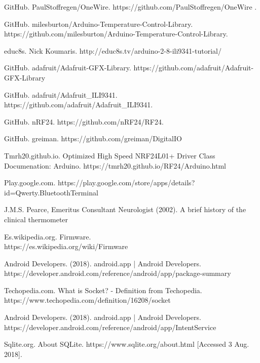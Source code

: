 \begin{thebibliography}{9}
GitHub. PaulStoffregen/OneWire. https://github.com/PaulStoffregen/OneWire .

GitHub. milesburton/Arduino-Temperature-Control-Library. https://github.com/milesburton/Arduino-Temperature-Control-Library.

educ8s. Nick Koumaris.
http://educ8s.tv/arduino-2-8-ili9341-tutorial/

GitHub. adafruit/Adafruit-GFX-Library.  https://github.com/adafruit/Adafruit-GFX-Library

GitHub. adafruit/Adafruit\_ILI9341. https://github.com/adafruit/Adafruit\_ILI9341.

GitHub. nRF24. https://github.com/nRF24/RF24.

GitHub. greiman. https://github.com/greiman/DigitalIO

Tmrh20.github.io. Optimized High Speed NRF24L01+ Driver Class Documenation: Arduino. https://tmrh20.github.io/RF24/Arduino.html

Play.google.com. https://play.google.com/store/apps/details?id=Qwerty.BluetoothTerminal

J.M.S. Pearce, 
Emeritus Consultant Neurologist (2002). A brief history of the clinical thermometer

Es.wikipedia.org. Firmware.\\ 
https://es.wikipedia.org/wiki/Firmware

Android Developers. (2018). android.app  |  Android Developers.  https://developer.android.com/reference/android/app/package-summary 

Techopedia.com. What is Socket? - Definition from Techopedia. https://www.techopedia.com/definition/16208/socket

Android Developers. (2018). android.app  |  Android Developers.  https://developer.android.com/reference/android/app/IntentService

Sqlite.org. About SQLite. https://www.sqlite.org/about.html [Accessed 3 Aug. 2018].

\end{thebibliography}